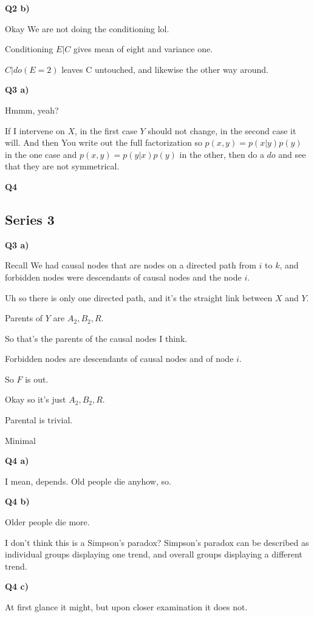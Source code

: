 \documentclass{article}
\begin{document}
		\textbf{Q2 b)}
		
			Okay We are not doing the conditioning lol.
			
			Conditioning $E|C$ gives mean of eight and variance one.
			
			$C|do(E=2)$ leaves C untouched, and likewise the other way around.
			
			
		\textbf{Q3 a)}
		
			Hmmm, yeah?
			
			If I intervene on $X$, in the first case $Y$ should not change, in the second case it will. And then You write out the full factorization so $p(x, y) = p(x|y)p(y)$ in the one case and $p(x, y) = p(y|x)p(y)$ in the other, then do a $do$ and see that they are not symmetrical.
			
		\textbf{Q4}
		
	\subsection{Series 3}
	
		\textbf{Q3 a)}
		
			Recall We had causal nodes that are nodes on a directed path from $i$ to $k$, and forbidden nodes were descendants of causal nodes and the node $i$.
			
			Uh so there is only one directed path, and it's the straight link between $X$ and $Y$.
			
			Parents of $Y$ are $A_2, B_2, R$.
			
			So that's the parents of the causal nodes I think.
			
			Forbidden nodes are descendants of causal nodes and of node $i$.
			
			So $F$ is out.
			
			Okay so it's just $A_2, B_2, R$.
			
			Parental is trivial.
			
			Minimal
			
		\textbf{Q4 a)}
	
			I mean, depends. Old people die anyhow, so.
			
		\textbf{Q4 b)}
		
			Older people die more. 
			
			I don't think this is a Simpson's paradox? Simpson's paradox can be described as individual groups displaying one trend, and overall groups displaying a different trend. 
			
		\textbf{Q4 c)}

			At first glance it might, but upon closer examination it does not.
			
\end{document}
